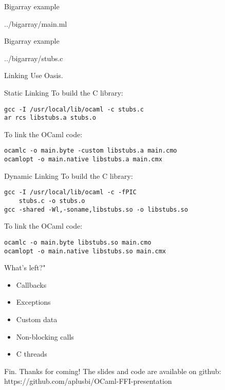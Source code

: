 \documentclass{beamer}
\begin{document}
\begin{frame}[fragile,shrink=5]{Bigarray example}
\begin{lstinputlisting}[language=ML]{../bigarray/main.ml}
\end{lstinputlisting}
\end{frame}

\begin{frame}[fragile,shrink=5]{Bigarray example}
\begin{lstinputlisting}[language=C]{../bigarray/stubs.c}
\end{lstinputlisting}
\end{frame}

\begin{frame}{Linking}
Use Oasis.
\end{frame}

\begin{frame}[fragile]{Static Linking}
To build the C library:
\begin{lstlisting}
gcc -I /usr/local/lib/ocaml -c stubs.c
ar rcs libstubs.a stubs.o
\end{lstlisting}

To link the OCaml code:
\begin{lstlisting}
ocamlc -o main.byte -custom libstubs.a main.cmo
ocamlopt -o main.native libstubs.a main.cmx
\end{lstlisting}
\end{frame}

\begin{frame}[fragile]{Dynamic Linking}
To build the C library:
\begin{lstlisting}
gcc -I /usr/local/lib/ocaml -c -fPIC
    stubs.c -o stubs.o
gcc -shared -Wl,-soname,libstubs.so -o libstubs.so
\end{lstlisting}

To link the OCaml code:
\begin{lstlisting}
ocamlc -o main.byte libstubs.so main.cmo
ocamlopt -o main.native libstubs.so main.cmx
\end{lstlisting}
\end{frame}

\begin{frame}{What's left?"}
\begin{itemize}
    \item Callbacks
    \item Exceptions
    \item Custom data
    \item Non-blocking calls
    \item C threads
\end{itemize}
\end{frame}

\begin{frame}{Fin.}
Thanks for coming!  The slides and code are available on github: https://github.com/aplusbi/OCaml-FFI-presentation
\end{frame}
\end{document}

